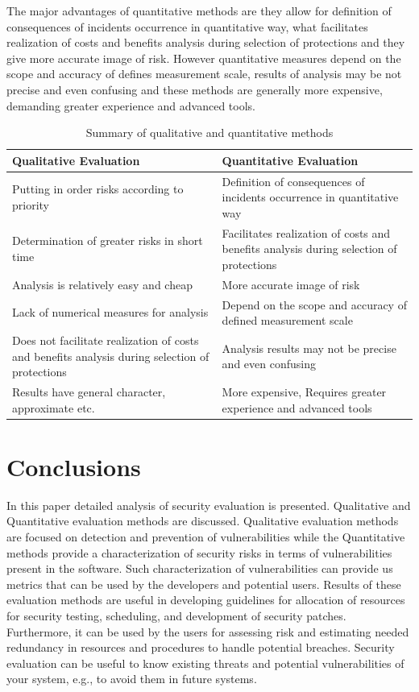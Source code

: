 \documentclass[pdftex,english,oribibl]{llncs}
\begin{document}
The major advantages of quantitative methods are they allow for definition of consequences of incidents occurrence in quantitative way, what facilitates realization of costs and benefits analysis during selection of protections and they give more accurate image of risk. However quantitative measures depend on the scope and accuracy of defines measurement scale, results of analysis may be not precise and even confusing and these methods are generally more expensive, demanding greater experience and advanced tools.

\begin{table}[ht]
	\centering\small
	\caption{Summary of qualitative and quantitative methods}
	\label{table:1}
		\begin{tabular}{p{2in}|p{2in}}
			\toprule
			Qualitative Evaluation & Quantitative Evaluation \\
			\midrule
			Putting in order risks according to priority
			 & Definition of consequences of incidents occurrence in quantitative way \\ 
			Determination of greater risks in short time
			 & Facilitates realization of costs and benefits analysis during selection of protections \\
			Analysis is relatively easy and cheap
			 & More accurate image of risk \\ 
			Lack of numerical measures for analysis
			& Depend on the scope and accuracy of defined measurement scale \\ 
			Does not facilitate realization of costs and benefits analysis during selection of protections
			& Analysis results may not be precise and even confusing \\ 
			Results have general character, approximate etc.
			& More expensive, Requires greater experience and advanced tools \\ 
			\bottomrule
		\end{tabular}
\end{table}
	
\section{Conclusions}\label{sec:conclusions}
In this paper detailed analysis of security evaluation is presented. Qualitative and Quantitative evaluation methods are discussed. Qualitative evaluation methods are focused on detection and prevention of vulnerabilities while the Quantitative methods provide a characterization of security risks in terms of vulnerabilities present in the software. Such characterization of vulnerabilities can provide us metrics that can be used by the developers and potential users. Results of these evaluation methods are useful in developing guidelines for allocation of resources for security testing, scheduling, and development of security patches. Furthermore, it can be used by the users for assessing risk and estimating needed redundancy in resources and procedures to handle potential breaches. Security evaluation can be useful to know existing threats and potential vulnerabilities of your system, e.g., to avoid them in future systems. 
\end{document}
